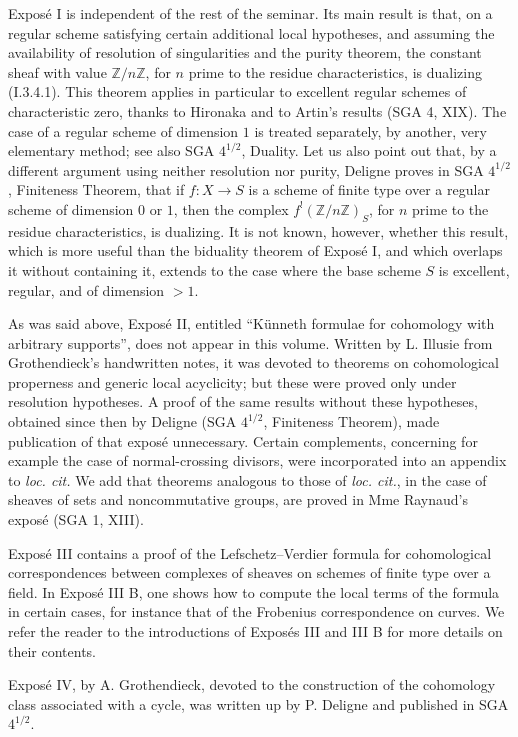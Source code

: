 \documentclass[11pt]{article}
\newcommand{\Z}{\mathbb{Z}}
\begin{document}
Exposé I is independent of the rest of the seminar. Its main result is that, on a regular scheme satisfying certain additional local hypotheses, and assuming the availability of resolution of singularities and the purity theorem, the constant sheaf with value $\Z/n\Z$, for $n$ prime to the residue characteristics, is dualizing (I.3.4.1). This theorem applies in particular to excellent regular schemes of characteristic zero, thanks to Hironaka and to Artin's results (SGA 4, XIX). The case of a regular scheme of dimension $1$ is treated separately, by another, very elementary method; see also SGA $4^{1/2}$, Duality. Let us also point out that, by a different argument using neither resolution nor purity, Deligne proves in SGA $4^{1/2}$, Finiteness Theorem, that if $f:X\to S$ is a scheme of finite type over a regular scheme of dimension $0$ or $1$, then the complex $f^!(\Z/n\Z)_S$, for $n$ prime to the residue characteristics, is dualizing. It is not known, however, whether this result, which is more useful than the biduality theorem of Exposé I, and which overlaps it without containing it, extends to the case where the base scheme $S$ is excellent, regular, and of dimension $>1$.

As was said above, Exposé II, entitled ``Künneth formulae for cohomology with arbitrary supports'', does not appear in this volume. Written by L. Illusie from Grothendieck's handwritten notes, it was devoted to theorems on cohomological properness and generic local acyclicity; but these were proved only under resolution hypotheses. A proof of the same results without these hypotheses, obtained since then by Deligne (SGA $4^{1/2}$, Finiteness Theorem), made publication of that exposé unnecessary. Certain complements, concerning for example the case of normal-crossing divisors, were incorporated into an appendix to \emph{loc. cit.} We add that theorems analogous to those of \emph{loc. cit.}, in the case of sheaves of sets and noncommutative groups, are proved in Mme Raynaud's exposé (SGA 1, XIII).

Exposé III contains a proof of the Lefschetz--Verdier formula for cohomological correspondences between complexes of sheaves on schemes of finite type over a field. In Exposé III B, one shows how to compute the local terms of the formula in certain cases, for instance that of the Frobenius correspondence on curves. We refer the reader to the introductions of Exposés III and III B for more details on their contents.

Exposé IV, by A. Grothendieck, devoted to the construction of the cohomology class associated with a cycle, was written up by P. Deligne and published in SGA $4^{1/2}$.
\end{document}
